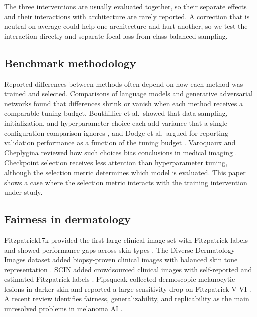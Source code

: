 The three interventions are usually evaluated together, so their separate effects and their interactions with architecture are rarely reported. A correction that is neutral on average could help one architecture and hurt another, so we test the interaction directly and separate focal loss from class-balanced sampling.

\subsection{Benchmark methodology}

Reported differences between methods often depend on how each method was trained and selected. Comparisons of language models \citep{melis2018evaluation} and generative adversarial networks \citep{lucic2018gans} found that differences shrink or vanish when each method receives a comparable tuning budget. Bouthillier et al.\ showed that data sampling, initialization, and hyperparameter choice each add variance that a single-configuration comparison ignores \citep{bouthillier2021variance}, and Dodge et al.\ argued for reporting validation performance as a function of the tuning budget \citep{dodge2019showyourwork}. Varoquaux and Cheplygina reviewed how such choices bias conclusions in medical imaging \citep{varoquaux2022failures}. Checkpoint selection receives less attention than hyperparameter tuning, although the selection metric determines which model is evaluated. This paper shows a case where the selection metric interacts with the training intervention under study.

\subsection{Fairness in dermatology}

Fitzpatrick17k provided the first large clinical image set with Fitzpatrick labels and showed performance gaps across skin types \citep{groh2021fitzpatrick17k}. The Diverse Dermatology Images dataset added biopsy-proven clinical images with balanced skin tone representation \citep{daneshjou2022ddi}. SCIN added crowdsourced clinical images with self-reported and estimated Fitzpatrick labels \citep{scin2024}. Pipsqueak collected dermoscopic melanocytic lesions in darker skin and reported a large sensitivity drop on Fitzpatrick V-VI \citep{ruga2026pipsqueak}. A recent review identifies fairness, generalizability, and replicability as the main unresolved problems in melanoma AI \citep{fairnessreview2024}.

